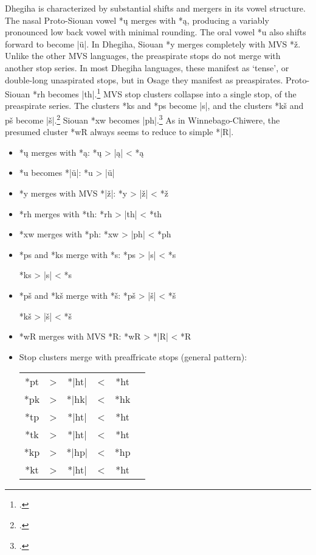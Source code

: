 \documentclass[output=paper]{LSP/langsci}
\begin{document}
Dhegiha is characterized by substantial shifts and mergers in its vowel structure.  The nasal Proto-Siouan vowel *\k{u} merges with *\k{a}, producing a variably pronounced low back vowel with minimal rounding.  The oral vowel *u also shifts forward to become |\"u|.  In Dhegiha, Siouan *y merges completely with MVS *\v{z}.  Unlike the other MVS languages, the preaspirate stops do not merge with another stop series.  In most Dhegiha languages, these manifest as `tense', or double-long unaspirated stops, but in Osage they manifest as preaspirates.  Proto-Siouan *rh becomes |th|.\footnote{\citealt[165]{Rankinetal2006PDF}.} MVS stop clusters collapse into a single stop, of the preaspirate series.  The clusters *ks and *ps become |s|, and the clusters *kš and pš become |š|.\footnote{\citealt[64, 123, 222, 849]{Rankinetal2006PDF}.} Siouan *xw becomes |ph|.\footnote{\citealt[180]{Rankinetal2006PDF}.} As in Winnebago-Chiwere, the presumed cluster *wR always seems to reduce to simple *|R|.

\begin{itemize}
\item *\k{u} merges with *\k{a}: \hspace{3.1em} *\k{u}	>	|\k{a}|	<	*\k{a}
\item *u becomes *|\"u|:	 \hspace{4.1em} *u	>	|\"u|
\item *y merges with MVS *|\v{z}|: \hspace{1em} *y	>	|\v{z}|	<	*\v{z}
\item *rh merges with *th: \hspace{3em} *rh	>	|th|	<	*th
\item *xw merges with *ph:	\hspace{ 3em} *xw	>	|ph|	<	*ph
\item *ps and *ks merge with *s: \hspace{1em} *ps	>	|s|	<	*s

\hspace{12em} *ks	>	|s|	<	*s
\item *pš and *kš merge with *š: \hspace{1em} *pš	>	|š|	<	*š

\hspace{12em} *kš	>	|š|	<	*š
\item *wR merges with MVS *R: \hspace{1em} *wR	>	*|R|	<	*R
\item Stop clusters merge with preaffricate stops (general pattern):	


\begin{tabular}[t]{c c c c c c }
*pt & > & *|ht| & < & *ht \\
*pk	& > & *|hk| & < & *hk \\
*tp & > & *|ht| & < & *ht \\
*tk & > & *|ht| & < & *ht \\
*kp	& >	 & *|hp|	& <	& *hp \\
*kt	& >	& *|ht| & < & *ht \\
\end{tabular}
\end{itemize} 
 
\end{document}
